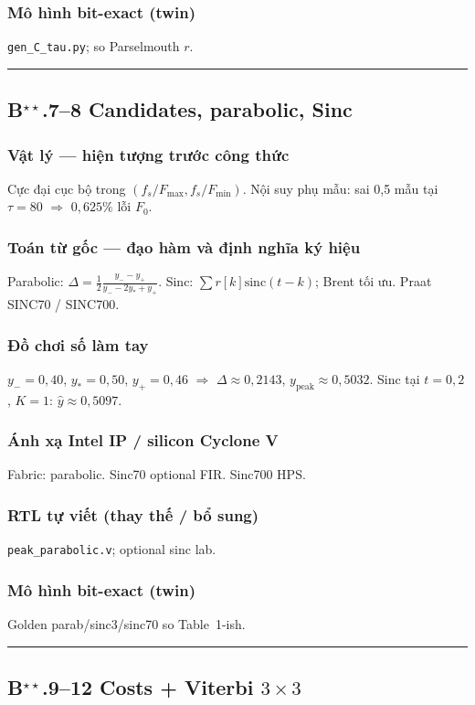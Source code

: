 \subsubsection*{Mô hình bit-exact (twin)}
\texttt{gen\_C\_tau.py}; so Parselmouth $r$.
\vspace{0.4cm}\hrule\vspace{0.4cm}
\subsection*{B$^{\star\star}$.7--8 Candidates, parabolic, Sinc}
\subsubsection*{Vật lý --- hiện tượng trước công thức}
Cực đại cục bộ trong $(f_s/F_{\max},f_s/F_{\min})$. Nội suy phụ mẫu: sai 0{,}5 mẫu tại $\tau=80$ $\Rightarrow$ $0{,}625\%$ lỗi $F_0$.
\subsubsection*{Toán từ gốc --- đạo hàm và định nghĩa ký hiệu}
Parabolic: $\Delta=\frac12\frac{y_--y_+}{y_--2y_*+y_+}$. Sinc: $\sum r[k]\mathrm{sinc}(t-k)$; Brent tối ưu. Praat SINC70 / SINC700.
\subsubsection*{Đồ chơi số làm tay}
$y_-=0{,}40$, $y_*=0{,}50$, $y_+=0{,}46$ $\Rightarrow$ $\Delta\approx0{,}2143$, $y_{\mathrm{peak}}\approx0{,}5032$. Sinc tại $t=0{,}2$, $K=1$: $\hat y\approx0{,}5097$.
\subsubsection*{Ánh xạ Intel IP / silicon Cyclone V}
Fabric: parabolic. Sinc70 optional FIR. Sinc700 HPS.
\subsubsection*{RTL tự viết (thay thế / bổ sung)}
\texttt{peak\_parabolic.v}; optional sinc lab.
\subsubsection*{Mô hình bit-exact (twin)}
Golden parab/sinc3/sinc70 so Table~1-ish.
\vspace{0.4cm}\hrule\vspace{0.4cm}
\subsection*{B$^{\star\star}$.9--12 Costs + Viterbi $3\times3$}
